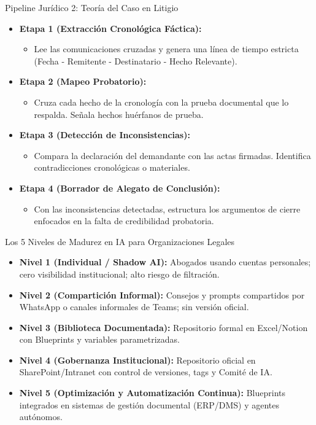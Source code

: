 \documentclass[aspectratio=169]{beamer}
\begin{document}
\begin{frame}{Pipeline Jurídico 2: Teoría del Caso en Litigio}

\begin{itemize}
  \item \textbf{Etapa 1 (Extracción Cronológica Fáctica):}
  \begin{itemize}
    \item Lee las comunicaciones cruzadas y genera una línea de tiempo estricta (Fecha - Remitente - Destinatario - Hecho Relevante).
  \end{itemize}
  \item \textbf{Etapa 2 (Mapeo Probatorio):}
  \begin{itemize}
    \item Cruza cada hecho de la cronología con la prueba documental que lo respalda. Señala hechos huérfanos de prueba.
  \end{itemize}
  \item \textbf{Etapa 3 (Detección de Inconsistencias):}
  \begin{itemize}
    \item Compara la declaración del demandante con las actas firmadas. Identifica contradicciones cronológicas o materiales.
  \end{itemize}
  \item \textbf{Etapa 4 (Borrador de Alegato de Conclusión):}
  \begin{itemize}
    \item Con las inconsistencias detectadas, estructura los argumentos de cierre enfocados en la falta de credibilidad probatoria.
  \end{itemize}
\end{itemize}
\end{frame}

\begin{frame}{Los 5 Niveles de Madurez en IA para Organizaciones Legales}

\begin{itemize}
  \item \textbf{Nivel 1 (Individual / Shadow AI):} Abogados usando cuentas personales; cero visibilidad institucional; alto riesgo de filtración.
  \item \textbf{Nivel 2 (Compartición Informal):} Consejos y prompts compartidos por WhatsApp o canales informales de Teams; sin versión oficial.
  \item \textbf{Nivel 3 (Biblioteca Documentada):} Repositorio formal en Excel/Notion con Blueprints y variables parametrizadas.
  \item \textbf{Nivel 4 (Gobernanza Institucional):} Repositorio oficial en SharePoint/Intranet con control de versiones, tags y Comité de IA.
  \item \textbf{Nivel 5 (Optimización y Automatización Continua):} Blueprints integrados en sistemas de gestión documental (ERP/DMS) y agentes autónomos.
\end{itemize}
\end{frame}
\end{document}
